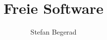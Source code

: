 
\usepackage{hyperref}

\usepackage{colortbl}

\usepackage{listings}

\title{Freie Software}
\author{Stefan Begerad}
